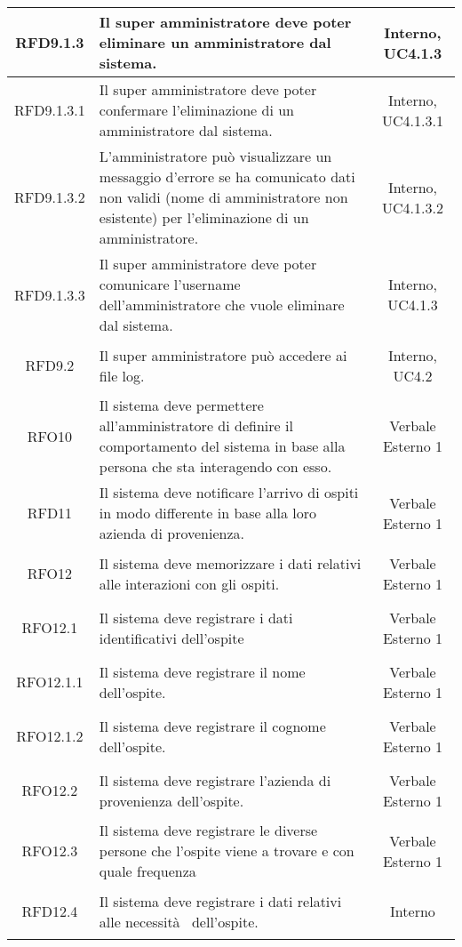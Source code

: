 \begin{longtable}{|c|>{\centering}m{7cm}|c|}
	\hypertarget{RFD9.1.3}{RFD9.1.3} & Il super amministratore deve poter eliminare un amministratore dal sistema. & Interno, UC4.1.3\\ \hline
	\hypertarget{RFD9.1.3.1}{RFD9.1.3.1} & Il super amministratore deve poter confermare l'eliminazione di un amministratore dal sistema. & Interno, UC4.1.3.1\\ \hline
	\hypertarget{RFD9.1.3.2}{RFD9.1.3.2} & L'amministratore può visualizzare un messaggio d'errore se ha comunicato dati non validi (nome di amministratore non esistente) per l'eliminazione di un amministratore. & Interno, UC4.1.3.2\\ \hline
	\hypertarget{RFD9.1.3.3}{RFD9.1.3.3} & Il super amministratore deve poter comunicare l'username dell'amministratore che vuole eliminare dal sistema. & Interno, UC4.1.3\\ \hline
	\hypertarget{RFD9.2}{RFD9.2} & Il super amministratore può accedere ai file log. & Interno, UC4.2\\ \hline
	\hypertarget{RFO10}{RFO10} & Il sistema deve permettere all'amministratore di definire il comportamento del sistema in base alla persona che sta interagendo con esso. & Verbale Esterno 1\\ \hline
	\hypertarget{RFD11}{RFD11} & Il sistema deve notificare l'arrivo di ospiti in modo differente in base alla loro azienda di provenienza. & Verbale Esterno 1\\ \hline
	\hypertarget{RFO12}{RFO12} & Il sistema deve memorizzare i dati relativi alle interazioni con gli ospiti. & Verbale Esterno 1\\ \hline
	\hypertarget{RFO12.1}{RFO12.1} & Il sistema deve registrare i dati identificativi dell'ospite & Verbale Esterno 1\\ \hline
	\hypertarget{RFO12.1.1}{RFO12.1.1} & Il sistema deve registrare il nome dell'ospite. & Verbale Esterno 1\\ \hline
	\hypertarget{RFO12.1.2}{RFO12.1.2} & Il sistema deve registrare il cognome dell'ospite. & Verbale Esterno 1\\ \hline
	\hypertarget{RFO12.2}{RFO12.2} & Il sistema deve registrare l'azienda di provenienza dell'ospite. & Verbale Esterno 1\\ \hline
	\hypertarget{RFO12.3}{RFO12.3} & Il sistema deve registrare le diverse persone che l'ospite viene a trovare e con quale frequenza & Verbale Esterno 1\\ \hline
	\hypertarget{RFD12.4}{RFD12.4} & Il sistema deve registrare i dati relativi alle necessità  dell'ospite. & Interno\\ \hline

\end{longtable}
